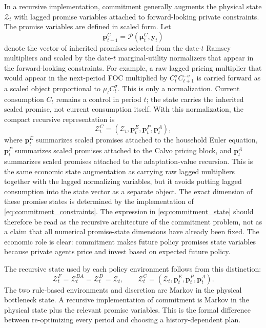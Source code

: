 ﻿\documentclass[12pt]{article}
\theoremstyle{remark}
\begin{document}
In a recursive implementation, commitment generally augments the physical state $\mathcal Z_t$ with
lagged promise variables attached to forward-looking private constraints. The promise variables are
defined in scaled form. Let
\[
    \mathbf p_{t+1}^C
    =
    \mathcal P(\boldsymbol\mu_t^C,\mathbf y_t)
\]
denote the vector of inherited promises selected from the date-$t$ Ramsey multipliers and scaled
by the date-$t$ marginal-utility normalizers that appear in the forward-looking constraints. For
example, a raw lagged pricing multiplier that would appear in the next-period FOC multiplied by
$C_t^\sigma C_{t+1}^{-\sigma}$ is carried forward as a scaled object proportional to
$\mu_t C_t^\sigma$. This is only a normalization. Current consumption $C_t$ remains a control in
period $t$; the state carries the inherited scaled promise, not current consumption itself. With
this normalization, the compact recursive representation is
\begin{equation}
    \mathcal Z_t^C
    =
    \left(
        \mathcal Z_t,
        \mathbf p_t^{E},
        \mathbf p_t^{P},
        \mathbf p_t^{A}
    \right),
    \label{eq:commitment_state}
\end{equation}
where $\mathbf p_t^{E}$ summarizes scaled promises attached to the household Euler equation,
$\mathbf p_t^{P}$ summarizes scaled promises attached to the Calvo pricing block, and
$\mathbf p_t^{A}$ summarizes scaled promises attached to the adaptation-value recursion. This is
the same economic state augmentation as carrying raw lagged multipliers together with the lagged
normalizing variables, but it avoids putting lagged consumption into the state vector as a separate
object. The exact dimension of these promise states is determined by the implementation of
\eqref{eq:commitment_constraints}. The expression in \eqref{eq:commitment_state} should therefore
be read as the recursive architecture of the commitment problem, not as a claim that all numerical
promise-state dimensions have already been fixed. The economic role is clear: commitment makes
future policy promises state variables because private agents price and invest based on expected
future policy.

The recursive state used by each policy environment follows from this distinction:
\begin{equation}
    \mathcal Z_t^{F}
    =
    \mathcal Z_t^{BA}
    =
    \mathcal Z_t^{D}
    =
    \mathcal Z_t,
    \qquad
    \mathcal Z_t^{C}
    =
    \left(
        \mathcal Z_t,
        \mathbf p_t^{E},
        \mathbf p_t^{P},
        \mathbf p_t^{A}
    \right).
    \label{eq:policy_environment_states}
\end{equation}
The two rule-based environments and discretion are Markov in the physical bottleneck state. A
recursive implementation of commitment is Markov in the physical state plus the relevant promise
variables. This is the formal difference between re-optimizing every period and choosing a
history-dependent plan.
\end{document}
